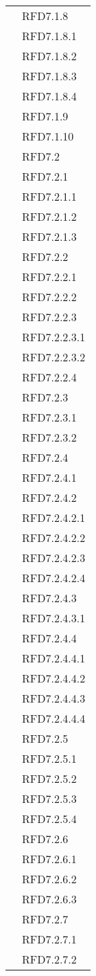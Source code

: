 \begin{longtable}{|>{\centering}m{10cm}|m{3cm}<{\centering}|}
& RFD7.1.8\\
& RFD7.1.8.1\\
& RFD7.1.8.2\\
& RFD7.1.8.3\\
& RFD7.1.8.4\\
& RFD7.1.9\\
& RFD7.1.10\\
& RFD7.2\\
& RFD7.2.1\\
& RFD7.2.1.1\\
& RFD7.2.1.2\\
& RFD7.2.1.3\\
& RFD7.2.2\\
& RFD7.2.2.1\\
& RFD7.2.2.2\\
& RFD7.2.2.3\\
& RFD7.2.2.3.1\\
& RFD7.2.2.3.2\\
& RFD7.2.2.4\\
& RFD7.2.3\\
& RFD7.2.3.1\\
& RFD7.2.3.2\\
& RFD7.2.4\\
& RFD7.2.4.1\\
& RFD7.2.4.2\\
& RFD7.2.4.2.1\\
& RFD7.2.4.2.2\\
& RFD7.2.4.2.3\\
& RFD7.2.4.2.4\\
& RFD7.2.4.3\\
& RFD7.2.4.3.1\\
& RFD7.2.4.4\\
& RFD7.2.4.4.1\\
& RFD7.2.4.4.2\\
& RFD7.2.4.4.3\\
& RFD7.2.4.4.4\\
& RFD7.2.5\\
& RFD7.2.5.1\\
& RFD7.2.5.2\\
& RFD7.2.5.3\\
& RFD7.2.5.4\\
& RFD7.2.6\\
& RFD7.2.6.1\\
& RFD7.2.6.2\\
& RFD7.2.6.3\\
& RFD7.2.7\\
& RFD7.2.7.1\\
& RFD7.2.7.2\\

\end{longtable}
